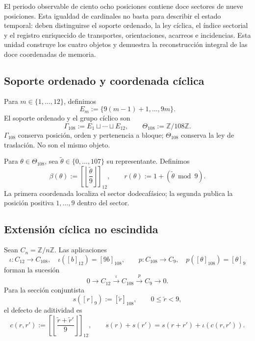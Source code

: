 {El periodo observable de ciento ocho posiciones contiene doce sectores de
nueve posiciones. Esta igualdad de cardinales no basta para describir el
estado temporal: deben distinguirse el soporte ordenado, la ley cíclica, el
índice sectorial y el registro enriquecido de transportes, orientaciones,
acarreos e incidencias. Esta unidad construye los cuatro objetos y demuestra
la reconstrucción integral de las doce coordenadas de memoria.

\subsection{Soporte ordenado y coordenada cíclica}

Para \(m\in\{1,\ldots,12\}\), definimos
\begin{equation}
 E_m:=\{9(m-1)+1,\ldots,9m\}.
 \label{p12-83-c1-s9:eq:u006d-bloques-nonadicos}
\end{equation}
El soporte ordenado y el grupo cíclico son
\begin{equation}
 \Gamma_{108}:=
 E_1\sqcup\cdots\sqcup E_{12},
 \qquad
 \Theta_{108}:=\mathbb Z/108\mathbb Z.
 \label{p12-83-c1-s9:eq:u006d-gamma-theta}
\end{equation}
\(\Gamma_{108}\) conserva posición, orden y pertenencia a bloque;
\(\Theta_{108}\) conserva la ley de traslación. No son el mismo objeto.

Para \(\theta\in\Theta_{108}\), sea
\(\widetilde\theta\in\{0,\ldots,107\}\) su representante. Definimos
\begin{equation}
 \beta(\theta):=
 \left[
 \left\lfloor\frac{\widetilde\theta}{9}\right\rfloor
 \right]_{12},
 \qquad
 r(\theta):=1+(\widetilde\theta\bmod9).
 \label{p12-83-c1-s9:eq:u006d-coordenadas-bloque-residuo}
\end{equation}
La primera coordenada localiza el sector dodecafásico; la segunda publica
la posición positiva \(1,\ldots,9\) dentro del sector.

\subsection{Extensión cíclica no escindida}

Sean \(C_n=\mathbb Z/n\mathbb Z\). Las aplicaciones
\begin{equation}
 \iota:C_{12}\longrightarrow C_{108},
 \quad \iota([b]_{12})=[9b]_{108},
 \qquad
 p:C_{108}\longrightarrow C_9,
 \quad p([\theta]_{108})=[\theta]_9
 \label{p12-83-c1-s9:eq:u006d-mapas-extension}
\end{equation}
forman la sucesión
\begin{equation}
 0\longrightarrow C_{12}
 \xrightarrow{\;\iota\;}C_{108}
 \xrightarrow{\;p\;}C_9
 \longrightarrow0.
 \label{p12-83-c1-s9:eq:u006d-extension}
\end{equation}
Para la sección conjuntista
\[
 s([r]_9):=[\widetilde r]_{108},
 \qquad 0\leq\widetilde r<9,
\]
el defecto de aditividad es
\begin{equation}
 c(r,r'):=
 \left[
 \left\lfloor
 \frac{\widetilde r+\widetilde r'}9
 \right\rfloor
 \right]_{12},
 \qquad
 s(r)+s(r')
 =s(r+r')+\iota(c(r,r')).
 \label{p12-83-c1-s9:eq:u006d-cociclo-extension}
\end{equation}

}
